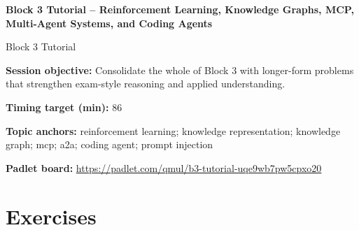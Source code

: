 \documentclass[11pt]{article}
\begin{document}
\begin{center}\LARGE\bfseries Block 3 Tutorial -- Reinforcement Learning, Knowledge Graphs, MCP, Multi-Agent Systems, and Coding Agents\end{center}

\begin{center}\large Block 3 Tutorial\end{center}

\begin{tcolorbox}[colback=MidnightBlue!4,colframe=MidnightBlue,title={Session Overview},fonttitle=\bfseries,breakable]
\textbf{Session objective:} Consolidate the whole of Block 3 with longer-form problems that strengthen exam-style reasoning and applied understanding.

\textbf{Timing target (min):} 86

\textbf{Topic anchors:} reinforcement learning; knowledge representation; knowledge graph; mcp; a2a; coding agent; prompt injection

\textbf{Padlet board:} \url{https://padlet.com/qmul/b3-tutorial-uqe9wb7pw5cpxo20}
\end{tcolorbox}

\section*{Exercises}
\end{document}
